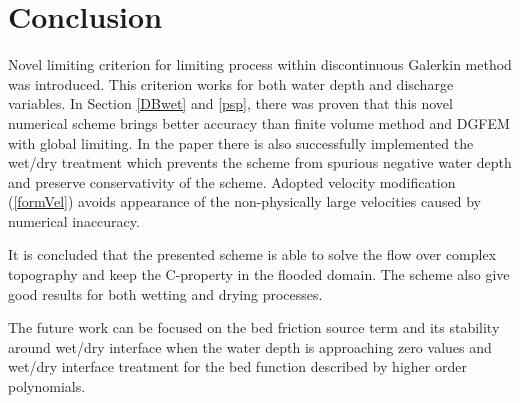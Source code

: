\section{Conclusion}

Novel limiting criterion for limiting process within discontinuous Galerkin method was introduced. This criterion works for both water depth and discharge variables. In Section \ref{DBwet} and \ref{psp}, there was proven that this novel numerical scheme brings better accuracy than finite volume method and DGFEM with global limiting. In the paper there is also successfully implemented the wet/dry treatment which prevents the scheme from spurious negative water depth and preserve conservativity of the scheme. Adopted velocity modification (\ref{formVel}) avoids appearance of the non-physically large velocities caused by numerical inaccuracy.


It is concluded that the presented scheme is able to solve the flow over complex topography and keep the C-property in the flooded domain. The scheme also give good results for both wetting and drying processes.

 The future work can be focused on the bed friction source term and its stability around wet/dry interface when the water depth is approaching zero values and wet/dry interface treatment for the bed function described by higher order polynomials.